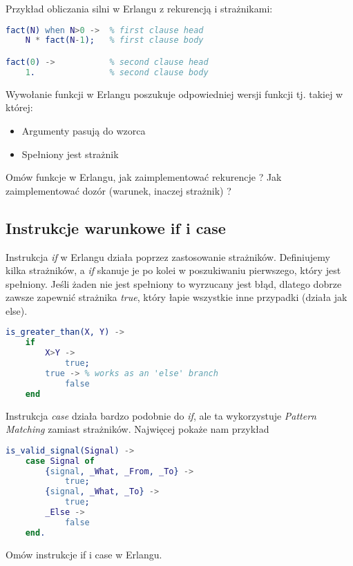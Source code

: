 \documentclass[a4paper,15pt]{article}
\newcommand{\ask}[2]{
    \begin{tcolorbox}[colback=black!5!white,colframe=gray,title={Pytanie #1}]
        #2
    \end{tcolorbox}
}
\begin{document}
Przykład obliczania silni w Erlangu z rekurencją i strażnikami:
\begin{lstlisting}[language=Erlang, caption=Silnia]
fact(N) when N>0 ->  % first clause head
    N * fact(N-1);   % first clause body

fact(0) ->           % second clause head
    1.               % second clause body
\end{lstlisting}
Wywołanie funkcji w Erlangu poszukuje odpowiedniej wersji funkcji tj. takiej w której:
\begin{itemize}
\item Argumenty pasują do wzorca
\item Spełniony jest strażnik
\end{itemize}

\ask{}{
Omów funkcje w Erlangu, jak zaimplementować rekurencje ? Jak zaimplementować dozór (warunek, inaczej strażnik) ? 
}


\subsection{Instrukcje warunkowe if i case}
Instrukcja \textit{if} w Erlangu działa poprzez zastosowanie strażników. Definiujemy kilka strażników, a \textit{if} skanuje je po kolei w poszukiwaniu pierwszego, który jest spełniony. Jeśli żaden nie jest spełniony to wyrzucany jest błąd, dlatego dobrze zawsze zapewnić strażnika \textit{true}, który łapie wszystkie inne przypadki (działa jak else).
\begin{lstlisting}[language=Erlang, caption=Przyklad if]
is_greater_than(X, Y) ->
    if
        X>Y ->
            true;
        true -> % works as an 'else' branch
            false
    end
\end{lstlisting}

Instrukcja \textit{case} działa bardzo podobnie do \textit{if}, ale ta wykorzystuje \textit{Pattern Matching} zamiast strażników. Najwięcej pokaże nam przykład
\begin{lstlisting}[language=Erlang, caption=Przyklad case]
is_valid_signal(Signal) ->
    case Signal of
        {signal, _What, _From, _To} ->
            true;
        {signal, _What, _To} ->
            true;
        _Else ->
            false
    end.
\end{lstlisting}

\ask{}{
Omów instrukcje if i case w Erlangu.
}
\end{document}
